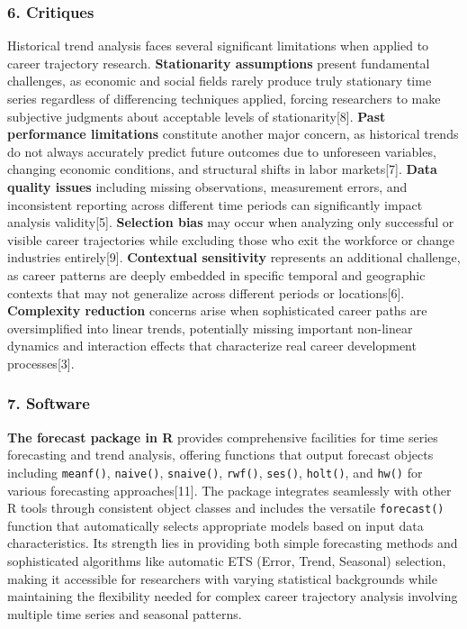 \documentclass[./main.tex]{subfiles}
\begin{document}
\subsubsection{6. Critiques}\label{critiques}

Historical trend analysis faces several significant limitations when
applied to career trajectory research. \textbf{Stationarity assumptions}
present fundamental challenges, as economic and social fields rarely
produce truly stationary time series regardless of differencing
techniques applied, forcing researchers to make subjective judgments
about acceptable levels of stationarity{[}8{]}. \textbf{Past performance
limitations} constitute another major concern, as historical trends do
not always accurately predict future outcomes due to unforeseen
variables, changing economic conditions, and structural shifts in labor
markets{[}7{]}. \textbf{Data quality issues} including missing
observations, measurement errors, and inconsistent reporting across
different time periods can significantly impact analysis
validity{[}5{]}. \textbf{Selection bias} may occur when analyzing only
successful or visible career trajectories while excluding those who exit
the workforce or change industries entirely{[}9{]}. \textbf{Contextual
sensitivity} represents an additional challenge, as career patterns are
deeply embedded in specific temporal and geographic contexts that may
not generalize across different periods or locations{[}6{]}.
\textbf{Complexity reduction} concerns arise when sophisticated career
paths are oversimplified into linear trends, potentially missing
important non-linear dynamics and interaction effects that characterize
real career development processes{[}3{]}.

\subsubsection{7. Software}\label{software}

\textbf{The forecast package in R} provides comprehensive facilities for
time series forecasting and trend analysis, offering functions that
output forecast objects including \texttt{meanf()}, \texttt{naive()},
\texttt{snaive()}, \texttt{rwf()}, \texttt{ses()}, \texttt{holt()}, and
\texttt{hw()} for various forecasting approaches{[}11{]}. The package
integrates seamlessly with other R tools through consistent object
classes and includes the versatile \texttt{forecast()} function that
automatically selects appropriate models based on input data
characteristics. Its strength lies in providing both simple forecasting
methods and sophisticated algorithms like automatic ETS (Error, Trend,
Seasonal) selection, making it accessible for researchers with varying
statistical backgrounds while maintaining the flexibility needed for
complex career trajectory analysis involving multiple time series and
seasonal patterns.
\end{document}
